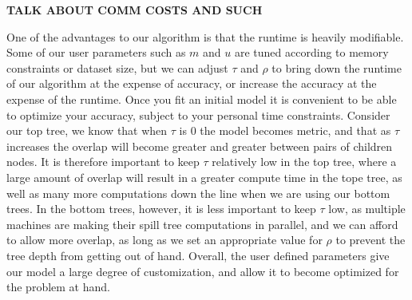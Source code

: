 \vspace{5 mm}
\noindent
\textbf{TALK ABOUT COMM COSTS AND SUCH}

\vspace{5 mm}
\noindent
One of the advantages to our algorithm is that the runtime is heavily 
modifiable.  Some of our user parameters such as $m$ and $u$ are tuned according
to memory constraints or dataset size, but we can adjust $\tau$ and $\rho$ to 
bring down the runtime of our algorithm at the expense of accuracy, or increase 
the accuracy at the expense of the runtime.  Once you fit an initial model it is 
convenient to be able to optimize your accuracy, subject to your personal time 
constraints.  Consider our top tree, we know that when $\tau$ is 0 the model 
becomes metric, and that as $\tau$ increases the overlap will become greater and 
greater between pairs of children nodes.  It is therefore important to keep 
$\tau$ relatively low in the top tree, where a large amount of overlap will 
result in a greater compute time in the tope tree, as well as many more 
computations down the line when we are using our bottom trees.  In the bottom 
trees, however, it is less important to keep $\tau$ low, as multiple machines 
are making their spill tree computations in parallel, and we can afford to allow 
more overlap, as long as we set an appropriate value for $\rho$ to prevent the 
tree depth from getting out of hand.  Overall, the user defined parameters give 
our model a large degree of customization, and allow it to become optimized for 
the problem at hand.
